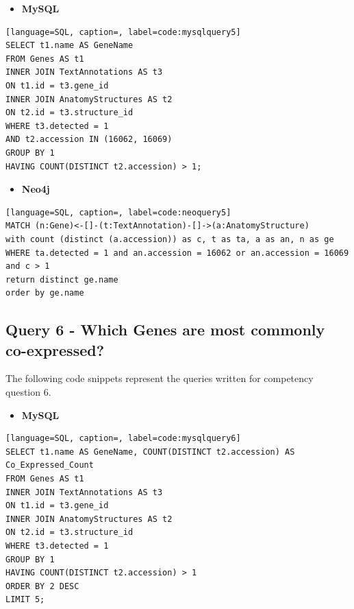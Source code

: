 \begin{itemize}[leftmargin=*]
\item \textbf{MySQL}
\end{itemize}

\begin{lstlisting}[language=SQL, caption=, label=code:mysqlquery5]
SELECT t1.name AS GeneName
FROM Genes AS t1
INNER JOIN TextAnnotations AS t3
ON t1.id = t3.gene_id
INNER JOIN AnatomyStructures AS t2
ON t2.id = t3.structure_id
WHERE t3.detected = 1
AND t2.accession IN (16062, 16069)
GROUP BY 1
HAVING COUNT(DISTINCT t2.accession) > 1;
\end{lstlisting}

\begin{itemize}[leftmargin=*]
\item \textbf{Neo4j}
\end{itemize}

\begin{lstlisting}[language=SQL, caption=, label=code:neoquery5]
MATCH (n:Gene)<-[]-(t:TextAnnotation)-[]->(a:AnatomyStructure)
with count (distinct (a.accession)) as c, t as ta, a as an, n as ge
WHERE ta.detected = 1 and an.accession = 16062 or an.accession = 16069 and c > 1
return distinct ge.name
order by ge.name
\end{lstlisting}

\newpage
\subsection*{Query 6 - Which Genes are most commonly co-expressed?}\label{query6}
The following code snippets represent the queries written for competency question 6.

\begin{itemize}[leftmargin=*]
\item \textbf{MySQL}
\end{itemize}

\begin{lstlisting}[language=SQL, caption=, label=code:mysqlquery6]
SELECT t1.name AS GeneName, COUNT(DISTINCT t2.accession) AS Co_Expressed_Count
FROM Genes AS t1
INNER JOIN TextAnnotations AS t3
ON t1.id = t3.gene_id
INNER JOIN AnatomyStructures AS t2
ON t2.id = t3.structure_id
WHERE t3.detected = 1
GROUP BY 1
HAVING COUNT(DISTINCT t2.accession) > 1
ORDER BY 2 DESC
LIMIT 5;
\end{lstlisting}

